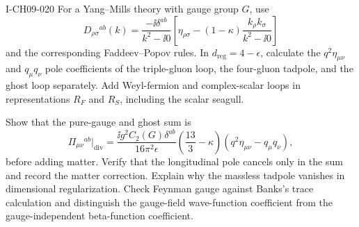 \begin{exercise}{I-CH09-020}
For a Yang--Mills theory with gauge group $G$, use
\[
  D_{\rho\sigma}{}^{ab}(k)=\frac{-\ii\delta^{ab}}{k^2-\ii0}
  \left[\eta_{\rho\sigma}-(1-\kappa)
  \frac{k_\rho k_\sigma}{k^2-\ii0}\right]
\]
and the corresponding Faddeev--Popov rules.  In $d_{\mathrm{reg}}=4-\epsilon$,
calculate the
$q^2\eta_{\mu\nu}$ and $q_\mu q_\nu$ pole coefficients of the triple-gluon
loop, the four-gluon tadpole, and the ghost loop separately.  Add Weyl-fermion
and complex-scalar loops in representations $R_F$ and $R_S$, including the
scalar seagull.

Show that the pure-gauge and ghost sum is
\[
  \Pi_{\mu\nu}{}^{ab}\big|_{\mathrm{div}}
  =\frac{\ii g^2C_2(G)\delta^{ab}}{16\pi^2\epsilon}
  \left(\frac{13}{3}-\kappa\right)
  (q^2\eta_{\mu\nu}-q_\mu q_\nu),
\]
before adding matter.  Verify that the longitudinal pole cancels only in the
sum and record the matter correction.  Explain why the massless tadpole
vanishes in dimensional regularization.  Check Feynman gauge against Banks's
trace calculation and distinguish the gauge-field wave-function coefficient
from the gauge-independent beta-function coefficient.
\end{exercise}
